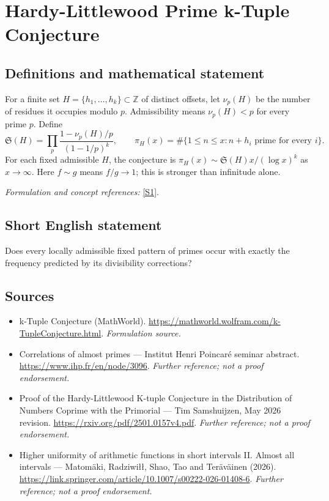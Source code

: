 \documentclass[11pt]{article}
\begin{document}
\section*{\texorpdfstring{Hardy-Littlewood Prime k-Tuple Conjecture}{Hardy-Littlewood Prime k-Tuple Conjecture}}\label{18}
\subsection{Definitions and mathematical statement}
For a finite set $H=\{h_1,\ldots,h_k\}\subset{\mathbb{Z}}$ of distinct offsets, let $\nu_p(H)$ be the number of residues it occupies modulo $p$. Admissibility means $\nu_p(H)<p$ for every prime $p$. Define
\[
 \mathfrak S(H)=\prod_p\frac{1-\nu_p(H)/p}{(1-1/p)^k},\qquad
 \pi_H(x)=\#\{1\le n\le x:n+h_i\text{ prime for every }i\}.
\]
For each fixed admissible $H$, the conjecture is $\pi_H(x)\sim\mathfrak S(H)x/(\log x)^k$ as $x\to\infty$. Here $f\sim g$ means $f/g\to1$; this is stronger than infinitude alone.
\par\smallskip\textit{Formulation and concept references:} \href{https://mathworld.wolfram.com/k-TupleConjecture.html}{[S1]}.

\subsection{Short English statement}
Does every locally admissible fixed pattern of primes occur with exactly the frequency predicted by its divisibility corrections?
\subsection{Sources}
\begin{itemize}
\item[S1]k-Tuple Conjecture (MathWorld).
\url{https://mathworld.wolfram.com/k-TupleConjecture.html}.
\textit{Formulation source.}
\item[S2]Correlations of almost primes — Institut Henri Poincaré seminar abstract.
\url{https://www.ihp.fr/en/node/3096}.
\textit{Further reference; not a proof endorsement.}
\item[S3]Proof of the Hardy-Littlewood K-tuple Conjecture in the Distribution of Numbers Coprime with the Primorial — Tim Samshuijzen, May 2026 revision.
\url{https://rxiv.org/pdf/2501.0157v4.pdf}.
\textit{Further reference; not a proof endorsement.}
\item[S4]Higher uniformity of arithmetic functions in short intervals II. Almost all intervals — Matomäki, Radziwiłł, Shao, Tao and Teräväinen (2026).
\url{https://link.springer.com/article/10.1007/s00222-026-01408-6}.
\textit{Further reference; not a proof endorsement.}
\end{itemize}
\end{document}
